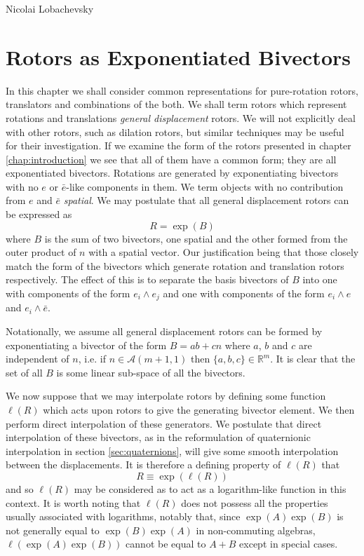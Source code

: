 \begin{savequote}
%
{Nicolai Lobachevsky}%
\end{savequote}

\chapter{Rotors as Exponentiated Bivectors}
\label{chap:exponential}

In this chapter we shall consider common representations for pure-rotation
rotors, translators and combinations of the both. We shall term rotors which
represent rotations and translations \emph{general displacement} rotors. We
will not explicitly deal with other rotors, such as dilation rotors, but
similar techniques may be useful for their investigation.  If we examine the
form of the rotors presented in chapter \ref{chap:introduction} we see that
all of them have a common form; they are all exponentiated bivectors.
Rotations are generated by exponentiating bivectors with no
$e$ or $\bar{e}$-like components in them. We term objects with no contribution
from $e$ and $\bar{e}$ \emph{spatial}.
We may
postulate that all general displacement rotors can be expressed as
\[
R = \exp(B)
\]
where $B$ is the sum of two bivectors, one spatial and
the other formed from the outer product of
$n$ with a spatial vector. Our justification being that those closely match
the form of the bivectors which generate rotation and translation rotors 
respectively. The effect of this is to separate the basis bivectors of $B$
into one with components of the form $e_i \wedge e_j$ and one with components
of the form $e_i \wedge e$ and $e_i \wedge \bar{e}$.

Notationally, we assume all general displacement rotors can be formed by
exponentiating a bivector of the form $B = ab + cn$ where $a$, $b$ and $c$ are
independent of $n$, i.e. if $n \in \mathcal{A}(m+1,1)$ then $\{a,b,c\} \in
\mathbb{R}^m$.  It is clear that the set of all $B$ is some linear sub-space
of all the bivectors.

We now suppose that we may interpolate rotors by defining some function
$\ell(R)$ which acts upon rotors to give the generating bivector element. We
then perform direct interpolation of these generators.  We postulate that
direct interpolation of these bivectors, as in the reformulation of
quaternionic interpolation in section \ref{sec:quaternions}, will give some
smooth interpolation between the displacements.  It is therefore a defining
property of $\ell(R)$ that
\begin{equation}
R \equiv \exp(\ell(R))
\end{equation}
and so $\ell(R)$ may be considered as to act as a logarithm-like function in
this context.  It is worth noting that $\ell(R)$ does not possess all the
properties usually associated with logarithms, notably that, since
$\exp(A)\exp(B)$ is not generally equal to $\exp(B)\exp(A)$ in non-commuting
algebras, $\ell(\exp(A)\exp(B))$ cannot be equal to $A + B$ except in special
cases.

